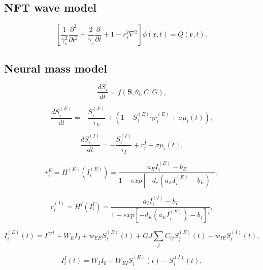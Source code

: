 \documentclass[sn-mathphys-num]{sn-jnl}%
\theoremstyle{thmstyleone}%
\theoremstyle{thmstyletwo}%
\theoremstyle{thmstylethree}%
\begin{document}
\subsection{NFT wave model} \label{sec:NFT_model}


\begin{equation}\label{eq:NFT_wave_model}
	[\frac{1}{\gamma_s^2} \frac{\partial ^2}{\partial t^2} + 
	\frac{2}{\gamma_s} \frac{\partial}{\partial t} + 1 - r_s^2 \nabla^2] 
	\phi(\textbf{r}, t) = Q(\textbf{r}, t),
\end{equation}


\subsection{Neural mass model} \label{sec:neural_mass} 


\begin{equation}\label{eq:temporal_activity}
	\frac{dS_i}{dt} = f(\boldsymbol{S}, \theta_i, C, G), 
\end{equation}


\begin{equation}\label{eq:synaptic_gating_E}
	\frac{dS_i^{(E)}}{dt} = - \frac{S_i^{(E)}}{\tau_E} + (1-S_i^{(E)} \gamma r_i^(E) + \sigma \mu_i(t)),
\end{equation}

\begin{equation}\label{eq:synaptic_gating_I}
	\frac{dS_i^{(I)}}{dt} = - \frac{S_i^{(I)}}{\tau_I} + r_i^{I} + \sigma \mu_i(t),
\end{equation}

\begin{equation}\label{eq:firing_rate_E}
	r_i^{E} = H^{(E)} (I_i^{(E)}) = \frac{a_E I_i^{(E)} - b_E}{1 - exp[-d_e (a_E I_i^{(E)} - b_E)]},
\end{equation}

\begin{equation}\label{eq:firing_rate_I}
	r_i^{(I)} = H^{I} (I_i^{I}) = \frac{a_I I_i^{(I)} - b_I}{1 - exp[-d_E (a_E I_i^{(E)}) - b_I]'},
\end{equation}

\begin{equation}\label{eq:input_current_E}
	I_i^{(E)}(t) = I^{ext} + W_E I_0 + w_{EE} S_i^{(E)} (t) + G J \sum_j C_{ij} S_j^{(E)}(t) - w_{IE} S_i^{(I)} (t), 
\end{equation}

\begin{equation}\label{eq:input_current_I}
	I_i^{I} (t) = W_I I_0 +
	W_{EI} S_i^{(E)} (t) - 
	S_i^{(I)} (t),
\end{equation}
\end{document}
